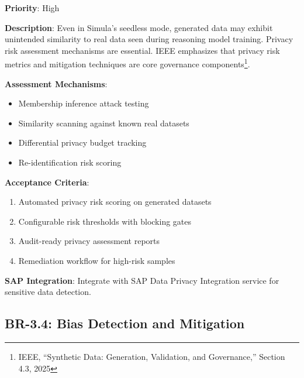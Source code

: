 \documentclass[12pt,a4paper,twoside]{report}
\begin{document}
\begin{tcolorbox}[colback=yellow!5,colframe=yellow!70,title=BR-3.3: Privacy Risk Evaluation]
\textbf{Priority}: High

\textbf{Description}: Even in Simula's seedless mode, generated data may exhibit
unintended similarity to real data seen during reasoning model training. Privacy
risk assessment mechanisms are essential. IEEE emphasizes that privacy risk
metrics and mitigation techniques are core governance components\footnote{IEEE,
``Synthetic Data: Generation, Validation, and Governance,'' Section 4.3, 2025}.

\textbf{Assessment Mechanisms}:
\begin{itemize}
\item Membership inference attack testing
\item Similarity scanning against known real datasets
\item Differential privacy budget tracking
\item Re-identification risk scoring
\end{itemize}

\textbf{Acceptance Criteria}:
\begin{enumerate}
\item Automated privacy risk scoring on generated datasets
\item Configurable risk thresholds with blocking gates
\item Audit-ready privacy assessment reports
\item Remediation workflow for high-risk samples
\end{enumerate}

\textbf{SAP Integration}: Integrate with SAP Data Privacy Integration service
for sensitive data detection.
\end{tcolorbox}

\subsection{BR-3.4: Bias Detection and Mitigation}
\end{document}
